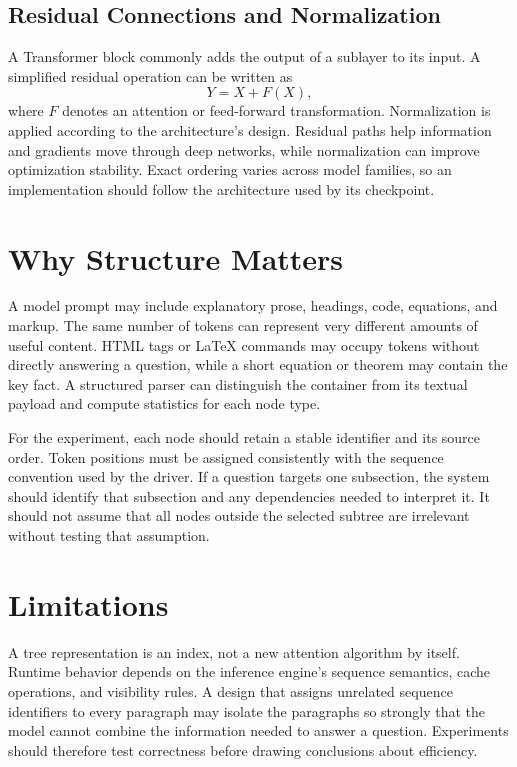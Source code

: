 \documentclass{article}
\begin{document}
\subsection{Residual Connections and Normalization}
A Transformer block commonly adds the output of a sublayer to its input. A simplified residual operation can be written as
\begin{equation}
Y=X+F(X),
\end{equation}
where $F$ denotes an attention or feed-forward transformation. Normalization is applied according to the architecture's design. Residual paths help information and gradients move through deep networks, while normalization can improve optimization stability. Exact ordering varies across model families, so an implementation should follow the architecture used by its checkpoint.

\section{Why Structure Matters}
A model prompt may include explanatory prose, headings, code, equations, and markup. The same number of tokens can represent very different amounts of useful content. HTML tags or LaTeX commands may occupy tokens without directly answering a question, while a short equation or theorem may contain the key fact. A structured parser can distinguish the container from its textual payload and compute statistics for each node type.

For the experiment, each node should retain a stable identifier and its source order. Token positions must be assigned consistently with the sequence convention used by the driver. If a question targets one subsection, the system should identify that subsection and any dependencies needed to interpret it. It should not assume that all nodes outside the selected subtree are irrelevant without testing that assumption.

\section{Limitations}
A tree representation is an index, not a new attention algorithm by itself. Runtime behavior depends on the inference engine's sequence semantics, cache operations, and visibility rules. A design that assigns unrelated sequence identifiers to every paragraph may isolate the paragraphs so strongly that the model cannot combine the information needed to answer a question. Experiments should therefore test correctness before drawing conclusions about efficiency.
\end{document}
